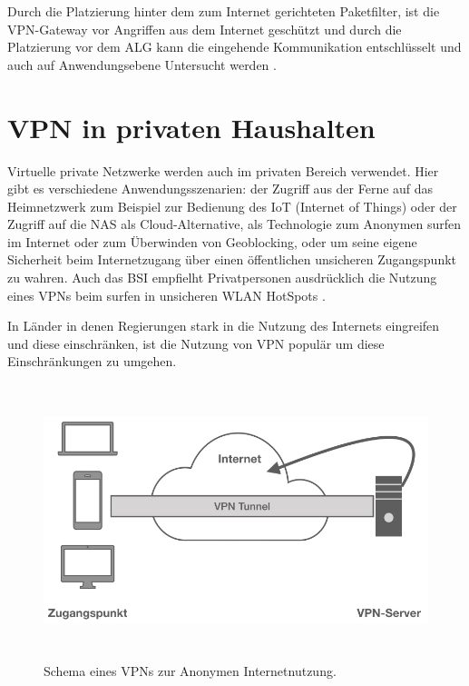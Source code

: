 Durch die Platzierung hinter dem zum Internet gerichteten Paketfilter, ist die VPN-Gateway vor Angriffen aus dem Internet geschützt und durch die Platzierung vor dem ALG kann die eingehende Kommunikation entschlüsselt und auch auf Anwendungsebene Untersucht werden \cite{bsivpnaufbau}.\\
 

\section{VPN in privaten Haushalten}

Virtuelle private Netzwerke werden auch im privaten Bereich  verwendet. Hier gibt es verschiedene Anwendungsszenarien: der Zugriff aus der Ferne auf das Heimnetzwerk zum Beispiel zur Bedienung des IoT (Internet of Things) oder der Zugriff auf die NAS als Cloud-Alternative, als Technologie zum Anonymen surfen im Internet oder zum Überwinden von Geoblocking, oder um seine eigene Sicherheit beim Internetzugang über einen öffentlichen unsicheren Zugangspunkt zu wahren. Auch das BSI empfielht  Privatpersonen ausdrücklich die Nutzung eines VPNs beim surfen in unsicheren WLAN HotSpots \cite{bsibuergervpn}.

In Länder in denen Regierungen stark in die Nutzung des Internets eingreifen und diese einschränken, ist die Nutzung von VPN populär um diese Einschränkungen zu umgehen.\\


\begin{figure}[h]
	\includegraphics[width=\linewidth,height=8cm]{vpnPrivat.001.jpeg}
	\caption{Schema eines VPNs zur Anonymen Internetnutzung.}
	\label{vpnPrivat}
\end{figure}

